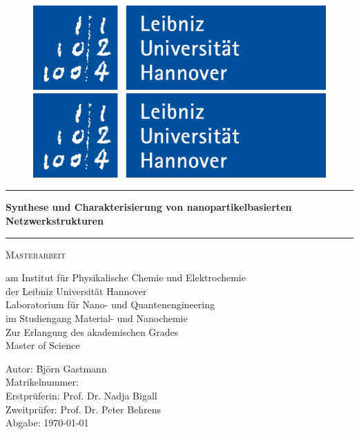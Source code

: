 
\begin{titlepage}
\centering
\begin{figure}
\includegraphics[width=0.3\linewidth,trim=0 0 0 5]{Bilder/LUH}
\hfill
\includegraphics[width=0.3\linewidth,trim=0 0 0 5]{Bilder/LUH}
\end{figure}

\vspace{1cm}
\noindent\hrule
{\huge\bfseries Synthese und Charakterisierung von nanopartikelbasierten Netzwerkstrukturen \par}
\noindent\hrule
\vspace{1cm}
{\scshape\Large Masterarbeit\par}
am Institut für Physikalische Chemie und Elektrochemie\\
der Leibniz Universität Hannover\\
Laboratorium für Nano- und Quantenengineering\\
\vspace{0.5cm}
im Studiengang Material- und Nanochemie\\
\vspace{0.5cm}
Zur Erlangung des akademischen Grades\\
Master of Science

\vfill
\begin{flushleft}
\begin{tabbing}
Autor: \qquad\qquad\qquad \= Björn Gastmann\\
Matrikelnummer: \\
Erstprüferin: \> Prof. Dr. Nadja Bigall\\
Zweitprüfer: \> Prof. Dr. Peter Behrens\\
Abgabe: \> \today\\
\end{tabbing}
\end{flushleft}
\end{titlepage}